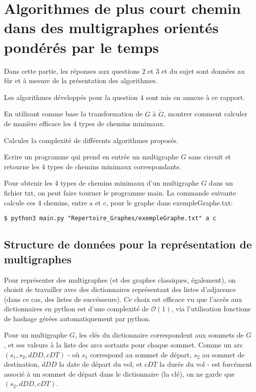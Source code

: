 \section{Algorithmes de plus court chemin dans des multigraphes orientés pondérés par le temps}
\label{sec:algos}

Dans cette partie, les réponses aux questions 2 et 3 et du sujet sont données au
fûr et à mesure de la présentation des algorithmes.

Les algorithmes développés pour la question 4 sont mis en annexe à ce rapport.

\begin{question}
  En utilisant comme base la transformation de $G$ à $\tilde{G}$, montrer
  comment calculer de manière efficace les 4 types de chemins minimaux.
\end{question}

\begin{question}
  Calculer la complexité de différents algorithmes proposés.
\end{question}

\begin{question}
  Ecrire un programme qui prend en entrée un multigraphe $G$ sans circuit et
  retourne les 4 types de chemins minimaux correspondants.
\end{question}

Pour obtenir les 4 types de chemins minimaux d'un multigraphe $G$ dans un
fichier txt, on peut faire tourner le programme main. La commande suivante
calcule ces 4 chemins, entre a et c, pour le graphe dans exempleGraphe.txt:
\begin{center}
\verb|$ python3 main.py "Repertoire_Graphes/exempleGraphe.txt" a c|
\end{center}
\subsection{Structure de données pour la représentation de multigraphes}

Pour représenter des multigraphes (et des graphes classiques, également), on
choisit de travailler avec des dictionnaires représentant des listes d'adjacence
(dans ce cas, des listes de succésseurs). Ce choix est efficace vu que l'accès
aux dictionnaires en python est d'une complexité de $\mathcal{O}(1)$, via
l'utilisation fonctions de hashage gérées automatiquement par python.

Pour un multigraphe $G$, les clés du dictionnaire correspondent aux sommets de
$G$, et ses valeurs à la liste des arcs sortants pour chaque sommet. Comme un
arc $(s_1,s_2,dDD,cDT)$ - où $s_1$ correspond au sommet de départ, $s_2$ au
sommet de destination, $dDD$ la date de départ du vol, et $cDT$ la durée du vol
- est forcément associé à un sommet de départ dans le dictionnaire (la clé), on
ne garde que $(s_2,dDD,cDT)$.

